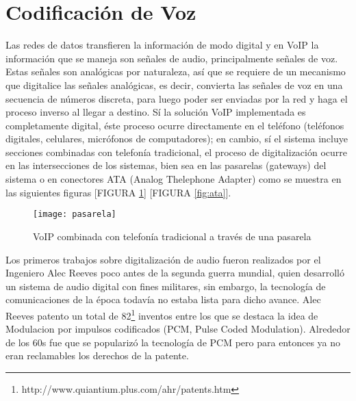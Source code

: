 	
\section{Codificación de Voz}

Las redes de datos transfieren la información de modo digital y en VoIP la información que se maneja son señales de audio, principalmente señales de voz. Estas señales son analógicas por naturaleza, así que se requiere de un mecanismo que digitalice las señales analógicas, es decir, convierta las señales de voz en una secuencia de números discreta, para luego poder ser enviadas por la red y haga el proceso inverso al llegar a destino. 
Sí la solución VoIP implementada es completamente digital, éste proceso ocurre directamente en el teléfono (teléfonos digitales, celulares, micrófonos de computadores); en cambio, sí el sistema incluye secciones combinadas con telefonía tradicional, el proceso de digitalización ocurre en las intersecciones de los sistemas, bien sea en las pasarelas (gateways) del sistema o en conectores ATA (Analog Thelephone Adapter) como se muestra en las siguientes figuras
[FIGURA \ref{fig:pasarela}]  [FIGURA \ref{fig:ata}].

	\begin{figure}[h]
		
		\texttt{[image: pasarela]}
		
		\caption{VoIP combinada con telefonía tradicional a través de una pasarela}
		
		\centering
		
		\label{fig:pasarela}
	\end{figure}

Los primeros trabajos sobre digitalización de audio fueron realizados por el Ingeniero Alec Reeves poco antes de la segunda guerra mundial, quien desarrolló un sistema de audio digital con fines militares, sin embargo, la tecnología de comunicaciones de la época todavía no estaba lista para dicho avance. Alec Reeves patento un total de 82\footnote{http://www.quiantium.plus.com/ahr/patents.htm}  inventos entre los que se destaca la idea de Modulacion por impulsos codificados (PCM, Pulse Coded Modulation). Alrededor de los 60s fue que se popularizó la tecnología de PCM pero para entonces ya no eran reclamables los derechos de la patente.

